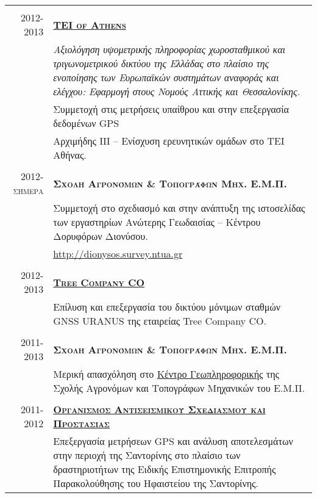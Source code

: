 \documentclass[a4paper,10pt]{article} %
\begin{document}
\begin{longtable}{r|p{13cm}}
\multicolumn{2}{c}{} \\
\textsc{2012-2013} & \textbf{\textsc{\href{http://www.teiath.gr/?lang=en}{TEI of Athens}}}\\
  & \textit{Αξιολόγηση υψομετρικής πληροφορίας χωροσταθμικού και τριγωνομετρικού δικτύου της Ελλάδας στο πλαίσιο της ενοποίησης των Ευρωπαϊκών συστημάτων αναφοράς και ελέγχου: Εφαρμογή στους Νομούς Αττικής και Θεσσαλονίκης.}\\
  & Συμμετοχή στις μετρήσεις υπαίθρου και στην επεξεργασία δεδομένων GPS\\
  & Αρχιμήδης ΙΙΙ – Ενίσχυση ερευνητικών ομάδων στο ΤΕΙ Αθήνας.\\

\multicolumn{2}{c}{} \\
\textsc{2012-σήμερα} & \textbf{\textsc{Σχολή Αγρονόμων \& Τοπογράφων Μηχ. Ε.Μ.Π.}}\\
  & Συμμετοχή στο σχεδιασμό και στην ανάπτυξη της ιστοσελίδας των εργαστηρίων Ανώτερης Γεωδαισίας – Κέντρου Δορυφόρων Διονύσου.\\
  & \url{http://dionysos.survey.ntua.gr}\\

\multicolumn{2}{c}{} \\
\textsc{2012-2013} & \textbf{\textsc{\href{http://www.treecomp.gr/}{Tree Company CO}}}\\
  & Επίλυση και επεξεργασία του δικτύου μόνιμων σταθμών GNSS URANUS της εταιρείας Tree Company CO.\\

\multicolumn{2}{c}{} \\
\textsc{2011-2013} & \textbf{\textsc{Σχολή Αγρονόμων \& Τοπογράφων Μηχ. Ε.Μ.Π.}}\\
  & Μερική απασχόληση στο \href{http://portal.survey.ntua.gr/main/geocenter/geocen-g.html}{Κέντρο Γεωπληροφορικής} της Σχολής Αγρονόμων και Τοπογράφων Μηχανικών του Ε.Μ.Π.\\

\multicolumn{2}{c}{} \\
\textsc{2011-2012} & \textbf{\textsc{\href{http://www.oasp.gr/}{Οργανισμός Αντισεισμικού Σχεδιασμού και Προστασίας}}}\\
  & Επεξεργασία μετρήσεων GPS και ανάλυση αποτελεσμάτων στην περιοχή της Σαντορίνης στο πλαίσιο των δραστηριοτήτων της Ειδικής Επιστημονικής Επιτροπής Παρακολούθησης του Ηφαιστείου της Σαντορίνης.\\


\end{longtable}
\end{document}
